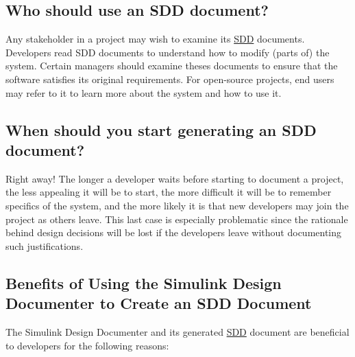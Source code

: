 \documentclass{mcscert}
\newcommand{\sddtool}{Simulink Design Documenter}
\begin{document}
\subsection{Who should use an SDD document?}
Any stakeholder in a project may wish to examine its \hyperref[acr:sdd]{SDD} documents. 
Developers read SDD documents to understand how to modify (parts of) the system.
Certain managers should examine theses documents to ensure that the software 
satisfies its original requirements. 
For open-source projects, 
end users may refer to it to learn more about the system and how to use it.
    
\subsection{When should you start generating an SDD document?}
Right away! 
The longer a developer waits before starting to document a project, 
the less appealing it will be to start, 
the more difficult it will be to remember specifics of the system, 
and the more likely it is that new developers may join the project as others 
leave. 
This last case is especially problematic since the rationale behind design 
decisions will be lost if the developers leave without documenting such 
justifications.
  	
\subsection{Benefits of Using the \sddtool{} to Create an SDD Document}
The \sddtool{} and its generated \hyperref[acr:sdd]{SDD} document are beneficial to \simulink{} 
developers for the following reasons:
\end{document}

